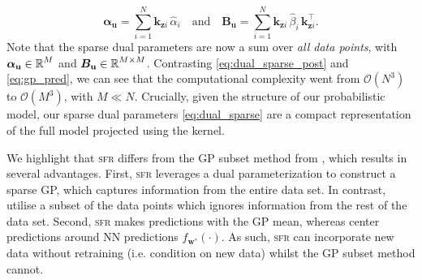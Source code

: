 \documentclass{article}
\newcommand{\our}{\textsc{sfr}\xspace}
\newcommand{\dataset}{\ensuremath{\mathcal{D}}}
\newcommand{\mathbold}[1]{\bm{#1}}
\newcommand{\mbf}[1]{\mathbf{#1}}
\newcommand{\T}{\top}
\newcommand{\valpha}[0]{\mathbold{\alpha}}
\newcommand{\MBeta}[0]{\mathbold{B}}
\newcommand{\vz}{\mbf{z}}
\newcommand{\vf}{\mbf{f}}
\newcommand{\vu}{\mbf{u}}
\newcommand{\vx}{\mbf{x}}
\newcommand{\vw}{\mbf{w}}
\newcommand{\MKzz}{\mbf{K}_{\mbf{z}\mbf{z}}}
\newcommand{\MKxx}{\mbf{K}_{\mbf{x}\mbf{x}}}
\newcommand{\vkzi}{\mbf{k}_{\mbf{z}i}}
\newcommand{\vkzs}{\mbf{k}_{\mbf{z}i}}
\newcommand{\vk}{\mbf{k}}
\newcommand{\myexpect}{\mathbb{E}}
\begin{document}
%
\begin{equation} \textstyle
  \valpha_{\vu}  =  \sum_{i=1}^N  \vkzi \, \hat{\alpha}_{i}
  \quad \text{and} \quad
  \MBeta_{\vu} =  \sum_{i=1}^N \vkzi \,\hat{\beta}_{i} \, \vkzi^{\T} .
\label{eq:dual_sparse}
\end{equation}
%
Note that the sparse dual parameters are now a sum over \emph{all data points}, with $\valpha_{\vu} \in \R^{M}$ and $\MBeta_{\vu} \in \R^{M  \times M}$.
Contrasting \cref{eq:dual_sparse_post} and \cref{eq:gp_pred}, we can see that the computational complexity went from $\mathcal{O}(N^3)$ to $\mathcal{O}(M^3)$, with $M \ll N$.
Crucially, given the structure of our probabilistic model, our sparse dual parameters \cref{eq:dual_sparse} are a compact representation of the full model projected using the kernel.





We highlight that \our differs from the GP subset method from \citet{immer2021improving}, which results in several advantages.
First, \our leverages a dual parameterization to construct a sparse GP, which captures information from the entire data set.
In contrast, \citet{immer2021improving} utilise a subset of the data points which ignores information from the rest of the data set.
Second, \our makes predictions with the GP mean, whereas \citet{immer2021improving} center predictions around NN predictions $f_{\vw^*}(\cdot)$.
As such, \our can incorporate new data without retraining (i.e. condition on new data) whilst the GP subset method cannot.
\end{document}
